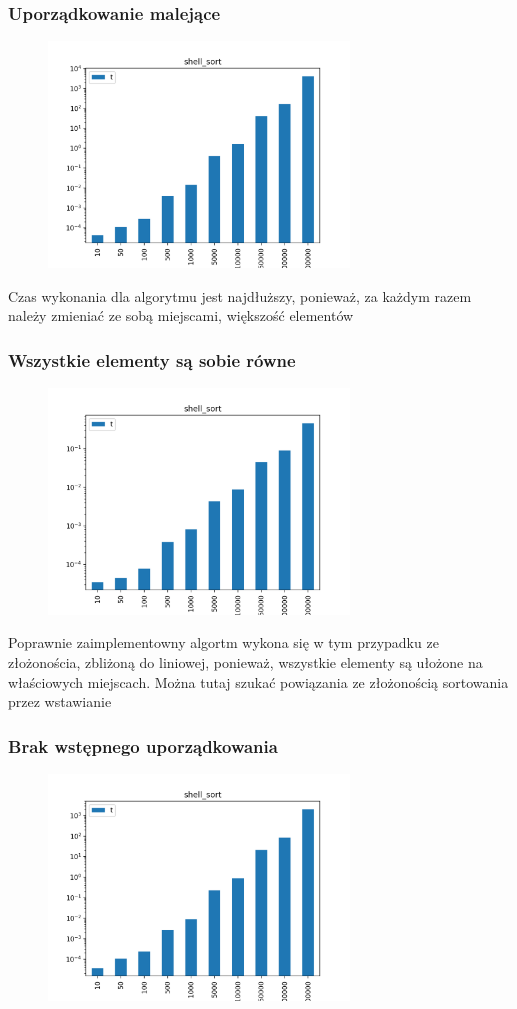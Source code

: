 \documentclass[]{article}
\begin{document}
		\subsubsection{Uporządkowanie malejące}
		\begin{figure}[H]
			\centering
			\includegraphics[width=8cm]{shell_sort_l.png}	
		\end{figure}
		Czas wykonania dla algorytmu jest najdłuższy, ponieważ, za każdym razem należy zmieniać ze sobą miejscami, większość elementów
		\subsubsection{Wszystkie elementy są sobie równe}
		\begin{figure}[H]
			\centering
			\includegraphics[width=8cm]{shell_sort_c.png}	
		\end{figure}
		Poprawnie zaimplementowny algortm wykona się w tym przypadku ze złożonościa, zbliżoną do liniowej, ponieważ, wszystkie elementy są ułożone na właściowych miejscach. Można tutaj szukać powiązania ze złożonością sortowania przez wstawianie
		\subsubsection{Brak wstępnego uporządkowania}
		\begin{figure}[H]
			\centering
			\includegraphics[width=8cm]{shell_sort_r.png}	
		\end{figure}


\pagebreak
\tableofcontents
\end{document}
